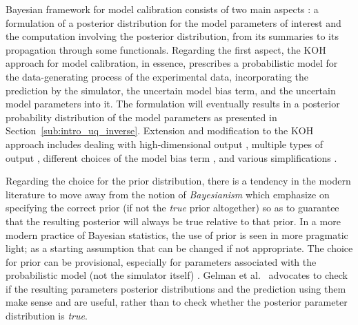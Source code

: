 Bayesian framework for model calibration consists of two main aspects \cite{Gelman2013}: a formulation of a posterior distribution for the model parameters of interest and the computation involving the posterior distribution, from its summaries to its propagation through some functionals.
Regarding the first aspect, the KOH approach for model calibration, in essence, prescribes a probabilistic model for the data-generating process of the experimental data, incorporating the prediction by the simulator, the uncertain model bias term, and the uncertain model parameters into it.
The formulation will eventually results in a posterior probability distribution of the model parameters as presented in Section~\ref{sub:intro_uq_inverse}.
Extension and modification to the KOH approach includes dealing with high-dimensional output \cite{Higdon2008,Bayarri2007a,Wilkinson2010}, multiple types of output \cite{Arendt2012a}, different choices of the model bias term \cite{Ling2014}, and various simplifications \cite{Arendt2012,Bayarri2007,Goldstein2012}.

Regarding the choice for the prior distribution, there is a tendency in the modern literature \cite{Gelman2013,McElreath2015} to move away from the notion of \emph{Bayesianism} which emphasize on specifying the correct prior (if not the \emph{true} prior altogether) so as to guarantee that the resulting posterior will always be true relative to that prior.
In a more modern practice of Bayesian statistics, the use of prior is seen in more pragmatic light; as a starting assumption that can be changed if not appropriate.
The choice for prior can be provisional, especially for parameters associated with the probabilistic model (not the simulator itself) \cite{Gelman2002,Gelman2006}.
Gelman et al.~\cite{Gelman2013} advocates to check if the resulting parameters posterior distributions and the prediction using them make sense and are useful, rather than to check whether the posterior parameter distribution is \emph{true}.

